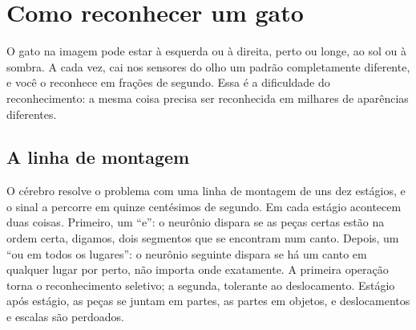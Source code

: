 \chapter{Como reconhecer um gato}


O gato na imagem pode estar à esquerda ou à direita, perto ou longe, ao sol ou à sombra. A cada vez, cai nos sensores do olho um padrão completamente diferente, e você o reconhece em frações de segundo. Essa é a dificuldade do reconhecimento: a mesma coisa precisa ser reconhecida em milhares de aparências diferentes.

\section*{A linha de montagem}

O cérebro resolve o problema com uma linha de montagem de uns dez estágios, e o sinal a percorre em quinze centésimos de segundo. Em cada estágio acontecem duas coisas. Primeiro, um ``e'': o neurônio dispara se as peças certas estão na ordem certa, digamos, dois segmentos que se encontram num canto. Depois, um ``ou em todos os lugares'': o neurônio seguinte dispara se há um canto em qualquer lugar por perto, não importa onde exatamente. A primeira operação torna o reconhecimento seletivo; a segunda, tolerante ao deslocamento. Estágio após estágio, as peças se juntam em partes, as partes em objetos, e deslocamentos e escalas são perdoados.


